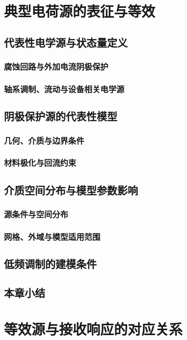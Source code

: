 

\chapter{典型电荷源的表征与等效}
\section{代表性电学源与状态量定义}
\subsection{腐蚀回路与外加电流阴极保护}
\subsection{轴系调制、流动与设备相关电学源}
\section{阴极保护源的代表性模型}
\subsection{几何、介质与边界条件}
\subsection{材料极化与回流约束}
\section{介质空间分布与模型参数影响}
\subsection{源条件与空间分布}
\subsection{网格、外域与模型适用范围}
\section{低频调制的建模条件}
\section{本章小结}

\chapter{等效源与接收响应的对应关系}
